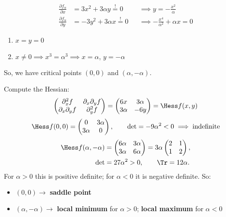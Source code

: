 \begin{exercisesolution}
\[
\begin{aligned}
\frac{\partial f_\alpha}{\partial x} &= 3x^2 + 3\alpha y \overset{!}{=} 0 &&\implies y = -\frac{x^2}{\alpha} \\
\frac{\partial f_\alpha}{\partial y} &= -3y^2 + 3\alpha x \overset{!}{=} 0 &&\implies -\frac{x^4}{\alpha^2} + \alpha x = 0
\end{aligned}
\]
\begin{enumerate}[label=\textbf{(\alph*)}]
  \item $x = y = 0$
  \item $x \neq 0 \implies x^3 = \alpha^3 \implies x = \alpha$, $y = -\alpha$
\end{enumerate}
So, we have critical points $(0,0)$ and $(\alpha, -\alpha)$.

Compute the Hessian:
\[\begin{pmatrix} \partial_x^2 f & \partial_x\partial_y f \\ \partial_x\partial_y f & \partial_y^2 f\end{pmatrix} = \begin{pmatrix} 6x & 3\alpha \\ 3\alpha & -6y \end{pmatrix} = \Hess f(x,y)\]
\[\Hess f(0,0) = \begin{pmatrix} 0 & 3\alpha \\ 3\alpha & 0\end{pmatrix}, \qquad \det = -9\alpha^2 < 0 \implies \text{indefinite}\]
\begin{align*}
\Hess f(\alpha,-\alpha) &= \begin{pmatrix} 6\alpha & 3\alpha \\ 3\alpha & 6\alpha\end{pmatrix}
  = 3\alpha\begin{pmatrix} 2 & 1 \\ 1 & 2\end{pmatrix}, \\
\det &= 27\alpha^2 > 0, \qquad \Tr = 12\alpha.
\end{align*}
For $\alpha > 0$ this is positive definite; for $\alpha < 0$ it is negative definite. So:
\begin{itemize}
  \item $(0,0) \longrightarrow$ \textbf{saddle point}
  \item $(\alpha,-\alpha) \longrightarrow$ \textbf{local minimum} for $\alpha > 0$; \textbf{local
    maximum} for $\alpha < 0$
\end{itemize}
\end{exercisesolution}

